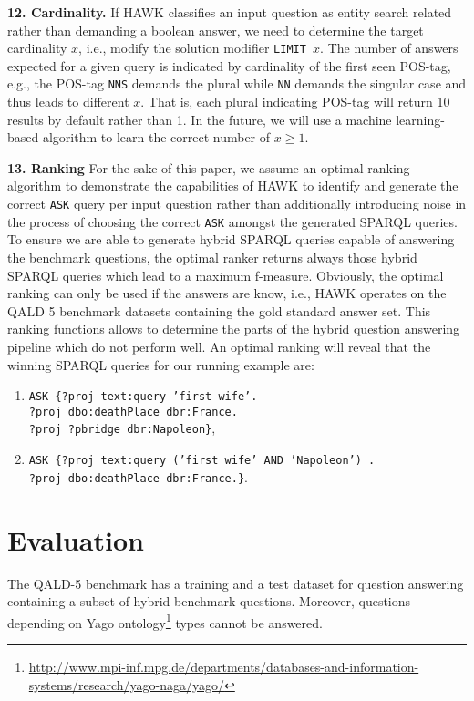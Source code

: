 \textbf{12. Cardinality.}
If HAWK classifies an input question as entity search related rather than demanding a boolean answer, we need to determine the target cardinality $x$, i.e., modify the solution modifier \texttt{LIMIT $x$}. 
The number of answers expected for a given query is indicated by cardinality of the first seen POS-tag, e.g., the POS-tag \texttt{NNS} demands the plural while \texttt{NN} demands the singular case and thus leads to different $x$.
That is, each plural indicating POS-tag will return 10 results by default rather than 1. 
In the future, we will use a machine learning-based algorithm to learn the correct number of $x \geq 1$.


\textbf{13. Ranking}
For the sake of this paper, we assume an optimal ranking algorithm to demonstrate the capabilities of HAWK to identify and generate the correct \texttt{ASK} query per input question rather than additionally introducing noise in the process of choosing the correct \texttt{ASK} amongst the generated SPARQL queries.
To ensure we are able to generate hybrid SPARQL queries capable of answering the benchmark questions, the optimal ranker returns always those hybrid SPARQL queries which lead to a maximum f-measure.  
Obviously, the optimal ranking can only be used if the answers are know, i.e., HAWK operates on the QALD 5 benchmark datasets containing the gold standard answer set.
This ranking functions allows to determine the parts of the hybrid question answering pipeline which do not perform well. 
An optimal ranking will reveal that the winning SPARQL queries for our running example are:
\begin{enumerate}
\item \texttt{ASK \{?proj text:query 'first wife'. \\?proj dbo:deathPlace dbr:France. \\?proj ?pbridge dbr:Napoleon\}}, 
\item \texttt{ASK \{?proj text:query ('first wife' AND 'Napoleon') .\\ ?proj dbo:deathPlace dbr:France.\}}.
\end{enumerate} 


\section{Evaluation}
\label{chanliwod:sec:evaluation}
\sloppy
The QALD-5 \cite{qald5} benchmark has a training and a test dataset for question answering containing a subset of hybrid benchmark questions.
Moreover, questions depending on Yago ontology\footnote{\url{http://www.mpi-inf.mpg.de/departments/databases-and-information-systems/research/yago-naga/yago/}} types cannot be answered.


